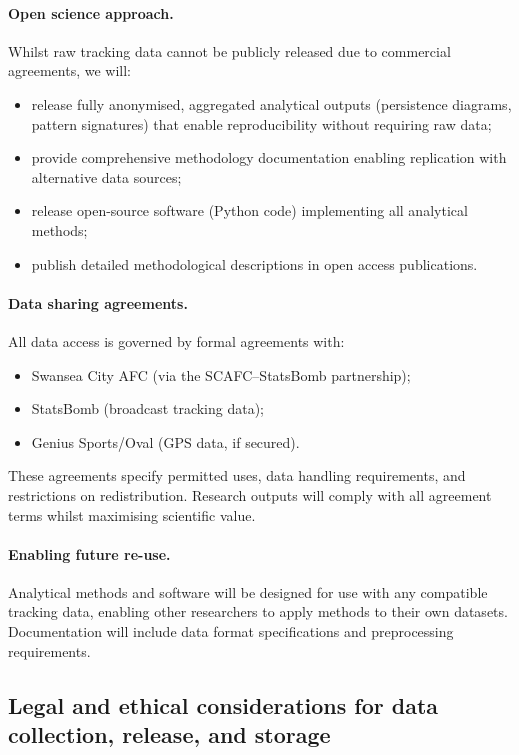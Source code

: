 \paragraph{Open science approach.}
Whilst raw tracking data cannot be publicly released due to commercial agreements, we will:
\begin{itemize}
  \item release fully anonymised, aggregated analytical outputs (persistence diagrams, pattern signatures) that enable reproducibility without requiring raw data;
  \item provide comprehensive methodology documentation enabling replication with alternative data sources;
  \item release open-source software (Python code) implementing all analytical methods;
  \item publish detailed methodological descriptions in open access publications.
\end{itemize}

\paragraph{Data sharing agreements.}
All data access is governed by formal agreements with:
\begin{itemize}
  \item Swansea City AFC (via the SCAFC--StatsBomb partnership);
  \item StatsBomb (broadcast tracking data);
  \item Genius Sports/Oval (GPS data, if secured).
\end{itemize}
These agreements specify permitted uses, data handling requirements, and restrictions on redistribution. Research outputs will comply with all agreement terms whilst maximising scientific value.

\paragraph{Enabling future re-use.}
Analytical methods and software will be designed for use with any compatible tracking data, enabling other researchers to apply methods to their own datasets. Documentation will include data format specifications and preprocessing requirements.

\subsection{Legal and ethical considerations for data collection, release, and storage}

